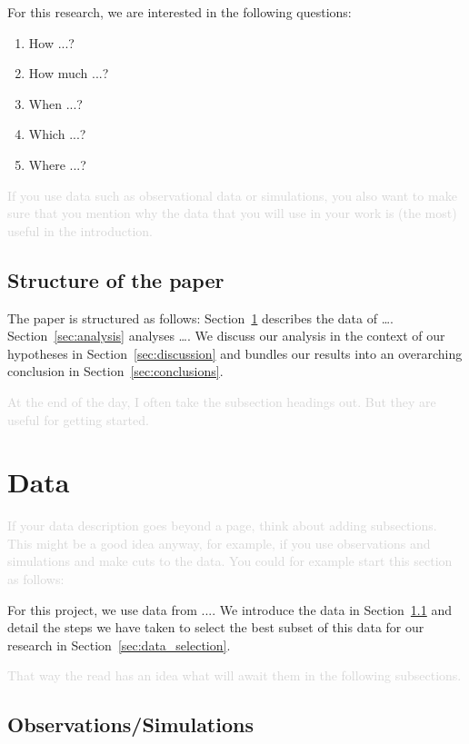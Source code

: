 \documentclass[twocolumn,apj,numberedappendix,appendixfloats]{openjournal}
\newcommand{\comment}[1]{\textcolor{lightgray}{#1}}
\begin{document}
For this research, we are interested in the following questions:
\begin{enumerate}
    \item How ...?
    \item How much ...?
    \item When ...?
    \item Which ...?
    \item Where ...?
\end{enumerate}

\comment{If you use data such as observational data or simulations, you also want to make sure that you mention why the data that you will use in your work is (the most) useful in the introduction.}

\subsection{Structure of the paper}

The paper is structured as follows: Section~\ref{sec:data} describes the data of \dots. Section~\ref{sec:analysis} analyses \dots. We discuss our analysis in the context of our hypotheses in Section~\ref{sec:discussion} and bundles our results into an overarching conclusion in Section~\ref{sec:conclusions}.

\comment{At the end of the day, I often take the subsection headings out. But they are useful for getting started.}

\clearpage
\section{Data} \label{sec:data}

\comment{If your data description goes beyond a page, think about adding subsections. This might be a good idea anyway, for example, if you use observations and simulations and make cuts to the data. You could for example start this section as follows:}

For this project, we use data from .... We introduce the data in Section~\ref{sec:data_observations} and detail the steps we have taken to select the best subset of this data for our research in Section~\ref{sec:data_selection}.

\comment{That way the read has an idea what will await them in the following subsections.}

\subsection{Observations/Simulations} \label{sec:data_observations}
\end{document}

